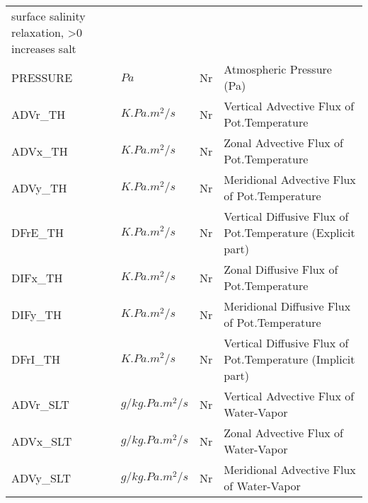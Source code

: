 \begin{tabular}{llll}
\begin{minipage}[t]{3in}
          {surface salinity relaxation, >0 increases salt}
         \end{minipage}\\
 PRESSURE & $Pa           $ & Nr 
         &\begin{minipage}[t]{3in}
          {Atmospheric Pressure (Pa)}
         \end{minipage}\\
 ADVr\_TH  & $K.Pa.m^2/s   $ & Nr 
         &\begin{minipage}[t]{3in}
          {Vertical   Advective Flux of Pot.Temperature}
         \end{minipage}\\
 ADVx\_TH  & $K.Pa.m^2/s   $ & Nr 
         &\begin{minipage}[t]{3in}
          {Zonal      Advective Flux of Pot.Temperature}
         \end{minipage}\\
 ADVy\_TH  & $K.Pa.m^2/s   $ & Nr 
         &\begin{minipage}[t]{3in}
          {Meridional Advective Flux of Pot.Temperature}
         \end{minipage}\\
 DFrE\_TH  & $K.Pa.m^2/s   $ & Nr 
         &\begin{minipage}[t]{3in}
          {Vertical Diffusive Flux of Pot.Temperature (Explicit part)}
         \end{minipage}\\
 DIFx\_TH  & $K.Pa.m^2/s   $ & Nr 
         &\begin{minipage}[t]{3in}
          {Zonal      Diffusive Flux of Pot.Temperature}
         \end{minipage}\\
 DIFy\_TH  & $K.Pa.m^2/s   $ & Nr 
         &\begin{minipage}[t]{3in}
          {Meridional Diffusive Flux of Pot.Temperature}
         \end{minipage}\\
 DFrI\_TH  & $K.Pa.m^2/s   $ & Nr 
         &\begin{minipage}[t]{3in}
          {Vertical Diffusive Flux of Pot.Temperature (Implicit part)}
         \end{minipage}\\
 ADVr\_SLT & $g/kg.Pa.m^2/s$ & Nr 
         &\begin{minipage}[t]{3in}
          {Vertical   Advective Flux of Water-Vapor}
         \end{minipage}\\
 ADVx\_SLT & $g/kg.Pa.m^2/s$ & Nr 
         &\begin{minipage}[t]{3in}
          {Zonal      Advective Flux of Water-Vapor}
         \end{minipage}\\
 ADVy\_SLT & $g/kg.Pa.m^2/s$ & Nr 
         &\begin{minipage}[t]{3in}
          {Meridional Advective Flux of Water-Vapor}
         \end{minipage}\\
\end{tabular}
\vspace{1.5in}
\vfill

